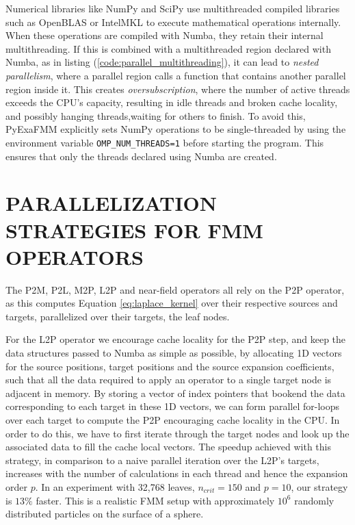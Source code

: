 \documentclass{IEEEcsmag}
\begin{document}
Numerical libraries like NumPy and SciPy use multithreaded compiled libraries such as OpenBLAS or IntelMKL to execute mathematical operations internally. When these operations are compiled with Numba, they retain their internal multithreading. If this is combined with a multithreaded region declared with Numba, as in listing (\ref{code:parallel_multithreading}), it can lead to \emph{nested parallelism}, where a parallel region calls a function that contains another parallel region inside it.
This creates \emph{oversubscription}, where the number of active threads exceeds the CPU's capacity, resulting in idle threads and broken cache locality, and possibly hanging threads,waiting for others to finish. To avoid this, PyExaFMM explicitly sets NumPy operations to be single-threaded by using the environment variable \lstinline{OMP_NUM_THREADS=1} before starting the program. This ensures that only the threads declared using Numba are created.




\section{PARALLELIZATION STRATEGIES FOR FMM OPERATORS}

The P2M, P2L, M2P, L2P and near-field operators all rely on the P2P operator, as this computes Equation \eqref{eq:laplace_kernel} over their respective sources and targets, parallelized over their targets, the leaf nodes.

For the L2P operator we encourage cache locality for the P2P step, and keep the data structures passed to Numba as simple as possible, by allocating 1D vectors for the source positions, target positions and the source expansion coefficients, such that all the data required to apply an operator to a single target node is adjacent in memory. By storing a vector of index pointers that bookend the data corresponding to each target in these 1D vectors, we can form parallel for-loops over each target to compute the P2P encouraging cache locality in the CPU. In order to do this, we have to first iterate through the target nodes and look up the associated data to fill the cache local vectors.
The speedup achieved with this strategy, in comparison to a naive parallel iteration over the L2P's targets, increases with the number of calculations in each thread and hence the expansion order $p$. In an experiment with 32,768 leaves, $n_{crit} = 150$ and $p=10$, our strategy is $13\%$ faster. This is a realistic FMM setup with approximately $10^6$ randomly distributed particles on the surface of a sphere.
\end{document}
